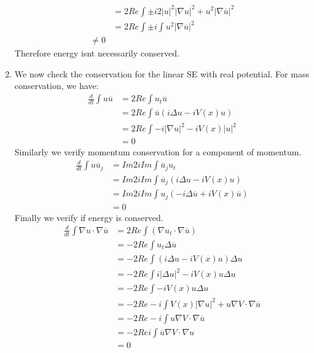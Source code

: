 \documentclass[12pt, a4paper]{article}
\theoremstyle{definition}
\newcommand{\grad}{\nabla}
\newcommand{\ol}{\overline}
\begin{document}
\begin{enumerate}[label = \roman*)]
\begin{align*}
	\\ & = 2 Re \int \pm i 2|u|^2 |\grad u|^2 + u^2 |\grad \ol{u}|^2
	\\ & = 2 Re \int \pm i \int u^2 |\grad \ol{u} |^2 \tag{first summand pure imaginary}
	\\ \neq 0
\end{align*}
Therefore energy isnt necessarily conserved. 
\item We now check the conservation for the linear SE with real potential. For mass conservation, we have: 
\begin{align*}
\frac{ d }{ dt } \int u \ol{u} & = 2 Re \int u_t \ol{u}
	\\ & = 2Re \int \ol{u} \left( i \Delta u - iV(x) u \right)
	\\ & = 2 Re \int -i |\grad u|^2 -iV(x) |u|^2 \tag{integrating by parts}
	\\ & = 0 \tag{integrand is pure imaginary}
\end{align*}
Similarly we verify momentum conservation for a component of momentum. 
\begin{align*}
	\frac{ d }{ dt  }\int u \ol{u}_j & = Im 2i Im \int \ol{u}_j u_t \tag{integrate by parts}
	\\ & = Im 2i Im \int \ol{u}_j \left( i \Delta u - i V(x) u \right)
	\\ & = Im 2i Im \int u_j \left( -i \Delta \ol{u} + i V(x) \ol{u} \right) \tag{integrate by parts}
	\\ & = 0 \tag{since equal to its conjugate}
\end{align*}
Finally we verify if energy is conserved.
\begin{align*}
	\frac{ d }{ dt } \int \grad u \cdot \grad \ol{u} & = 2Re \int \left( \grad u_t \cdot \grad \ol{u} \right)
	\\ & = -2 Re \int u_t \Delta \ol{u} \tag{Integrate by Parts}
	\\ & = -2 Re \int (i \Delta u - i V(x) u)\Delta u
	\\ & = -2 Re \int i |\Delta u|^2 - i V(x) u \Delta u
	\\ & = -2 Re \int -i V(x) u \Delta u\tag{first summand pure imaginary}
	\\ & = -2 Re -i \int V(x) |\grad u|^2 + u \grad V \cdot \grad \ol{u} 
	\\ & = -2 Re -i \int u \grad V \cdot \grad \ol{u} \tag{ first summand pure imaginary}
	\\ & = -2 Re i \int \ol{u} \grad V \cdot \grad u \tag{integrating by parts}
	\\ & = 0 \tag{since equal to its conjugate must be pure real and, and real part of i times integrand is 0}
\end{align*}
\end{enumerate}
\end{document}
